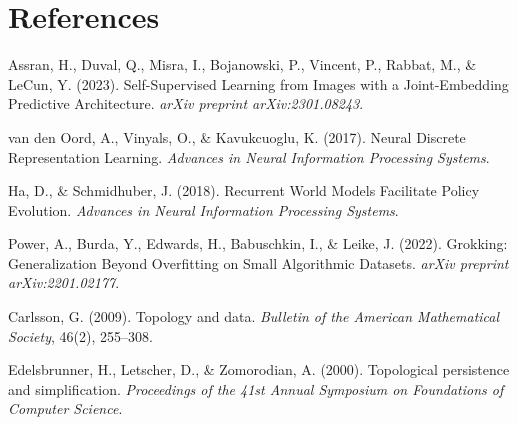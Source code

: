 \documentclass[11pt]{article}
\newcommand{\1}{\mathbbm{1}}
\begin{document}
\section{References}
\begin{enumerate}[leftmargin=2em,label={[{\arabic*}]}]
\item Assran, H., Duval, Q., Misra, I., Bojanowski, P., Vincent, P., Rabbat, M., \& LeCun, Y. (2023). Self-Supervised Learning from Images with a Joint-Embedding Predictive Architecture. \emph{arXiv preprint arXiv:2301.08243}.
\item van den Oord, A., Vinyals, O., \& Kavukcuoglu, K. (2017). Neural Discrete Representation Learning. \emph{Advances in Neural Information Processing Systems}.
\item Ha, D., \& Schmidhuber, J. (2018). Recurrent World Models Facilitate Policy Evolution. \emph{Advances in Neural Information Processing Systems}.
\item Power, A., Burda, Y., Edwards, H., Babuschkin, I., \& Leike, J. (2022). Grokking: Generalization Beyond Overfitting on Small Algorithmic Datasets. \emph{arXiv preprint arXiv:2201.02177}.
\item Carlsson, G. (2009). Topology and data. \emph{Bulletin of the American Mathematical Society}, 46(2), 255--308.
\item Edelsbrunner, H., Letscher, D., \& Zomorodian, A. (2000). Topological persistence and simplification. \emph{Proceedings of the 41st Annual Symposium on Foundations of Computer Science}.
\end{enumerate}
\end{document}
